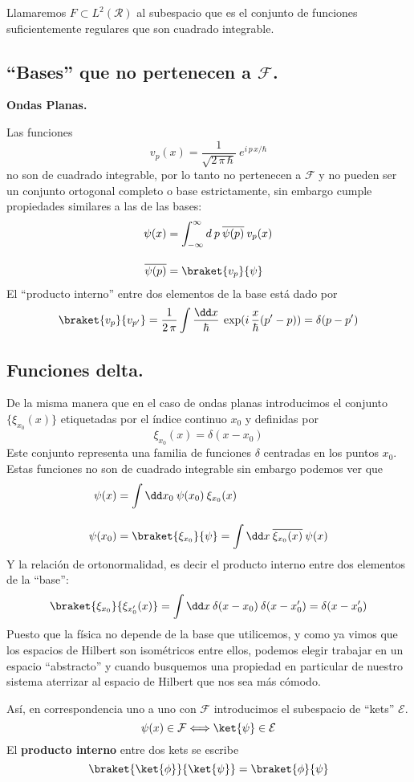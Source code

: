 Llamaremos $F \subset L^{2} (\mathcal{R})$ al subespacio que es el conjunto de funciones suficientemente regulares que son cuadrado integrable.
\subsection*{\enquote{Bases} que no pertenecen a $\mathcal{F}$.}
\textbf{Ondas Planas.}

Las funciones
\[ v_{p}(x) = \dfrac{1}{\sqrt{2 \, \pi \, \hbar}} \: e^{i \, p \, x / \hbar} \]
no son de cuadrado integrable, por lo tanto no pertenecen a $\mathcal{F}$ y no pueden ser un conjunto ortogonal completo o base estrictamente, sin embargo cumple propiedades similares a las de las bases:
\begin{align*}
\psi (x) &= \int_{-\infty}^{\infty} d \: p \: \overline{\psi (p)} \: v_{p} (x) \\[1em]
\overline{\psi (p)} &= \braket{v_{p}}{\psi}
\end{align*}
El \enquote{producto interno} entre dos elementos de la base está dado por
\[ \braket{v_{p}}{v_{p^{\prime}}} = \dfrac{1}{2 \, \pi} \int \dfrac{\dd x}{\hbar} \: \exp(i \, \frac{x}{\hbar}(p^{\prime} - p)) = \delta (p - p^{\prime}) \]
\subsection*{Funciones delta.}
De la misma manera que en el caso de ondas planas
introducimos el conjunto $\{\xi_{x_{0}} (x) \}$ etiquetadas por el índice continuo $x_{0}$ y definidas por
\[ \xi_{x_{0}} (x) = \delta (x - x_{0})\]
Este conjunto representa una familia de funciones $\delta$ centradas en los puntos $x_{0}$. Estas funciones no son de cuadrado integrable sin embargo podemos ver que
\begin{align*}
\psi (x) &= \int \dd x_{0} \: \psi(x_{0}) \: \xi_{x_{0}} (x) \\[1em]
\psi (x_{0}) &= \braket{\xi_{x_{0}}}{\psi} = \int \dd x \: \overline{\xi_{x_{0}}(x)} \: \psi(x)
\end{align*}
Y la relación de ortonormalidad, es decir el producto interno entre dos elementos de la \enquote{base}:
\[ \braket{\xi_{x_{0}}}{\xi_{x_{0}^{\prime}}(x)} = \int \dd x \: \delta (x - x_{0}) \: \delta (x - x_{0}^{\prime}) = \delta (x - x_{0}^{\prime}) \]
Puesto que la física no depende de la base que utilicemos, y como ya vimos que los espacios de Hilbert son isométricos entre ellos, podemos elegir trabajar en un espacio \enquote{abstracto} y cuando busquemos una propiedad en particular de nuestro sistema aterrizar al espacio de Hilbert que nos sea más cómodo. 
\par
Así, en correspondencia uno a uno con $\mathcal{F}$ introducimos el subespacio de \enquote{kets} $\mathcal{E}$.
\[ \psi (x) \in \mathcal{F} \Longleftrightarrow \ket{\psi} \in \mathcal{E} \]
El \textbf{producto interno} entre dos kets se escribe
\[ \braket{\ket{\phi}}{\ket{\psi}} = \braket{\phi}{\psi} \]

